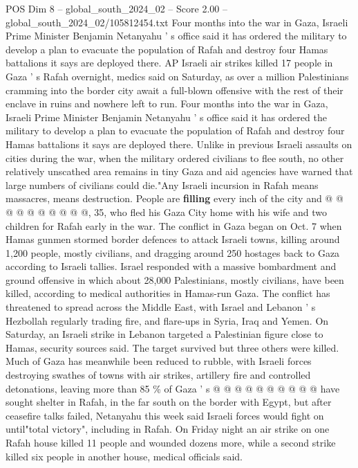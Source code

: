 \begin{textsample}{POS Dim 8 – global\_south\_2024\_02 – Score 2.00 – global\_south\_2024\_02/105812454.txt}  \label{ex:f8_pos_387}
Four months into the war in Gaza, Israeli Prime Minister Benjamin Netanyahu ' s office said it has ordered the military to develop a plan to evacuate the population of Rafah and destroy four Hamas battalions it says are deployed there.
AP Israeli air strikes killed 17 people in Gaza ' s Rafah overnight, medics said on Saturday, as over a million Palestinians cramming into the border city await a full-blown offensive with the rest of their enclave in ruins and nowhere left to run.
Four months into the war in Gaza, Israeli Prime Minister Benjamin Netanyahu ' s office said it has ordered the military to develop a plan to evacuate the population of Rafah and destroy four Hamas battalions it says are deployed there.
Unlike in previous Israeli assaults on cities during the war, when the military ordered civilians to flee south, no other relatively unscathed area remains in tiny Gaza and aid agencies have warned that large numbers of civilians could die."Any Israeli incursion in Rafah means massacres, means destruction.
People are \textbf{filling} every inch of the city and @ @ @ @ @ @ @ @ @ @, 35, who fled his Gaza City home with his wife and two children for Rafah early in the war.
The conflict in Gaza began on Oct. 7 when Hamas gunmen stormed border defences to attack Israeli towns, killing around 1,200 people, mostly civilians, and dragging around 250 hostages back to Gaza according to Israeli tallies.
Israel responded with a massive bombardment and ground offensive in which about 28,000 Palestinians, mostly civilians, have been killed, according to medical authorities in Hamas-run Gaza.
The conflict has threatened to spread across the Middle East, with Israel and Lebanon ' s Hezbollah regularly trading fire, and flare-ups in Syria, Iraq and Yemen.
On Saturday, an Israeli strike in Lebanon targeted a Palestinian figure close to Hamas, security sources said.
The target survived but three others were killed.
Much of Gaza has meanwhile been reduced to rubble, with Israeli forces destroying swathes of towns with air strikes, artillery fire and controlled detonations, leaving more than 85 \% of Gaza ' s @ @ @ @ @ @ @ @ @ @ have sought shelter in Rafah, in the far south on the border with Egypt, but after ceasefire talks failed, Netanyahu this week said Israeli forces would fight on until"total victory", including in Rafah.
On Friday night an air strike on one Rafah house killed 11 people and wounded dozens more, while a second strike killed six people in another house, medical officials said.

\end{textsample}
